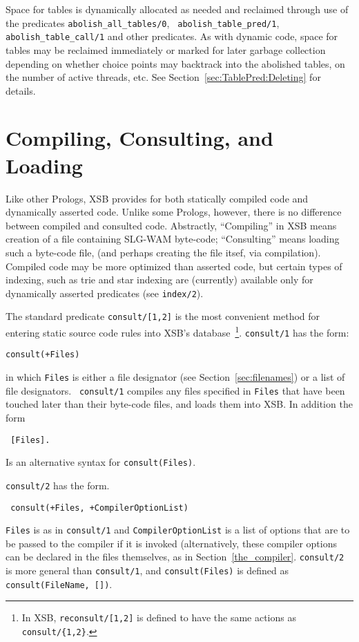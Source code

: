 Space for tables is dynamically allocated as needed and reclaimed
through use of the predicates {\tt abolish\_all\_tables/0}, {\tt
  abolish\_table\_pred/1}, {\tt abolish\_table\_call/1} and other
predicates.  As with dynamic code, space for tables may be reclaimed
immediately or marked for later garbage collection depending on
whether choice points may backtrack into the abolished tables, on the
number of active threads, etc.  See
Section~\ref{sec:TablePred:Deleting} for details.

\section{Compiling, Consulting, and Loading} \label{Consulting}
Like other Prologs, XSB provides for both statically compiled code and
dynamically asserted code.  Unlike some Prologs, however, there is no
difference between compiled and consulted code.  Abstractly,
``Compiling'' in XSB means creation of a file containing SLG-WAM
byte-code; ``Consulting'' means loading such a byte-code file, (and
perhaps creating the file itsef, via compilation).  Compiled code may
be more optimized than asserted code, but certain types of indexing,
such as trie and star indexing are (currently) available only for
dynamically asserted predicates (see {\tt index/2}).

The standard predicate {\tt consult/[1,2]} is the most convenient
method for entering static source code rules into XSB's
database~\footnote{In XSB, {\tt reconsult/[1,2]} is defined to have
the same actions as {\tt consult/\{1,2\}}.}.  {\tt consult/1} has the
form: 
%
\begin{center}
{\tt consult(+Files)}
\end{center}
%
in which {\tt Files} is either a file designator (see
Section~\ref{sec:filenames}) or a list of file designators.  {\tt
consult/1} compiles any files specified in {\tt Files} that have been
touched later than their byte-code files, and loads them into XSB.  In
addition the form
%
\begin{center}{\tt
	    [Files]. 
}\end{center}
%
Is an alternative syntax for {\tt consult(Files)}.

{\tt consult/2} has the form.
\begin{center}{\tt
	consult(+Files, +CompilerOptionList) }
\end{center} 
{\tt Files} is as in {\tt consult/1} and {\tt CompilerOptionList}
is a list of options that are to be passed to the compiler if it is
invoked (alternatively, these compiler options can be declared in the
files themselves, as in Section~\ref{the_compiler}.  {\tt consult/2}
is more general than {\tt consult/1}, and {\tt consult(Files)} is
defined as {\tt 	consult(FileName, [])}.

